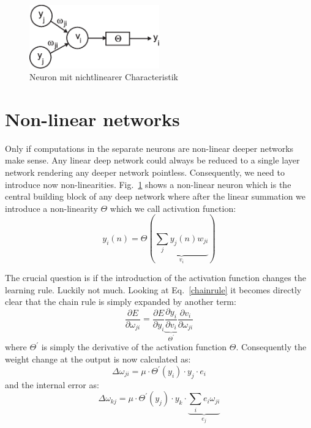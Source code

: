 \documentclass[12pt]{article}
\begin{document}
\begin{figure}[!hbt]
\begin{center}
\mbox{\includegraphics[width=0.5\textwidth]{nonlin}}
\end{center}
\caption{Neuron mit nichtlinearer Characteristik
\label{nonlin}}
\end{figure}

\section{Non-linear networks}
Only if computations in the separate neurons are non-linear
deeper networks make sense. Any linear deep network could always be
reduced to a single layer network rendering any deeper network
pointless. Consequently, we need to introduce now non-linearities.
Fig.~\ref{nonlin} shows a non-linear neuron which is the central building block
of any deep network where after the linear summation we introduce a non-linearity $\Theta$
which we call activation function:
\begin{equation}
  y_i(n) = \Theta\left(\underbrace{\sum_j y_j(n) w_{ji}}_{v_i} \right) \label{nonlinear_sum}
\end{equation}

The crucial question is if the introduction of the activation function
changes the learning rule. Luckily not much.
Looking at Eq.~\ref{chainrule} it becomes directly clear that the
chain rule is simply expanded by another term:
 \begin{equation}
 \frac{\partial E}{\partial \omega_{ji}}  = \frac{\partial E}{\partial y_i} \underbrace{\frac{\partial y_i}{\partial v_i}}_{\Theta^\prime} \frac{\partial v_i}{\partial \omega_{ji}}
 \end{equation}
 where $\Theta^\prime$ is simply the derivative of the activation function $\Theta$. Consequently the
 weight change at the output is now calculated as:
\begin{equation}
  \Delta\omega_{ji} = \mu \cdot \Theta^\prime(y_i) \cdot y_j \cdot e_i 
\end{equation}
and the internal error as:
\begin{equation}
\Delta\omega_{kj} = \mu \cdot \Theta^\prime(y_j) \cdot y_k \cdot \underbrace{\sum_i e_i \omega_{ji}}_{e_j} 
\end{equation}
\end{document}
